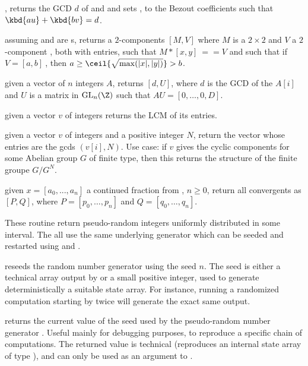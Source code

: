 , returns the GCD
$d$ of  and  and sets ,  to the Bezout coefficients
such that $\kbd{au} + \kbd{bv} = d$.

assuming  and  are s,
returns a $2$-components  $[M,V]$ where $M$ is a $2\times 2$
 and $V$ a $2$-component , both with  entries,
such that $M*[x,y]~==V$ and such that  if $V=[a,b]~$, then
$a \geq \ceil{\sqrt{\max(|x|,|y|)}} > b$.

 given a vector of $n$ integers $A$, returns $[d,
U]$, where $d$ is the GCD of the $A[i]$ and $U$ is a matrix
in $\text{GL}_n(\Z)$ such that $AU = [0,\dots,0,D]$.

 given a vector $v$ of integers
returns the LCM of its entries.

 given a vector $v$ of integers and a
positive integer $N$, return the vector whose entries are the gcds
$(v[i],N)$. Use case: if $v$ gives the cyclic components for some Abelian
group $G$ of finite type, then this returns the structure of the finite
groupe $G/G^N$.


 given $x = [a_0, ..., a_n]$ a
continued fraction from , $n\geq0$, return all
convergents as $[P,Q]$, where $P = [p_0,\dots,p_n]$ and $Q =
[q_0,\dots,q_n]$.

These routine return pseudo-random integers uniformly distributed in some
interval. The all use the same underlying generator which can be seeded and
restarted using  and .

 reseeds the random number generator using the
seed $n$. The seed is either a technical array output by 
or a small positive integer, used to generate deterministically a suitable
state array. For instance, running a randomized computation starting by
 twice will generate the exact same output.

 returns the current value of the seed used by the
pseudo-random number generator . Useful mainly for debugging
purposes, to reproduce a specific chain of computations. The returned value
is technical (reproduces an internal state array of type ),
and can only be used as an argument to .

